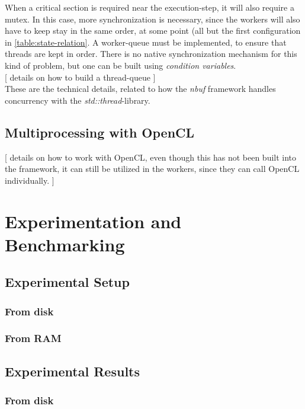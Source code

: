 \documentclass[a4paper]{article}
\newcommand{\nbuf}{\textit{nbuf} }
\begin{document}
When a critical section is required near the execution-step, it will also require a mutex. In this case, more synchronization is necessary, since the workers will also have to keep stay in the same order, at some point (all but the first configuration in \autoref{table:state-relation}. A worker-queue must be implemented, to ensure that threads are kept in order. There is no native synchronization mechanism for this kind of problem, but one can be built using \textit{condition variables}.\\

[ details on how to build a thread-queue ]\\

These are the technical details, related to how the \nbuf framework handles concurrency with the \textit{std::thread}-library.


\subsection{Multiprocessing with OpenCL}
[ details on how to work with OpenCL, even though this has not been built into the framework, it can still be utilized in the workers, since they can call OpenCL individually. ]\\



\newpage
\section{Experimentation and Benchmarking}


\subsection{Experimental Setup}

\subsubsection{From disk}

\subsubsection{From RAM}



\subsection{Experimental Results}

\subsubsection{From disk}
\end{document}
